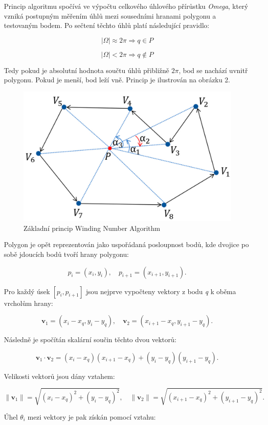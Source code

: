 \documentclass[a4paper,12pt]{article}
\begin{document}
Princip algoritmu spočívá ve výpočtu celkového úhlového přírůstku \textit{Omega}, který vzniká postupným měřením úhlů mezi sousedními hranami polygonu a testovaným bodem. Po sečtení těchto úhlů platí následující pravidlo:

\[
\left| \Omega \right| \approx 2\pi \Rightarrow q \in P
\]

\[
\left| \Omega \right| < 2\pi \Rightarrow q \notin P
\]

Tedy pokud je absolutní hodnota součtu úhlů přibližně \( 2\pi \), bod se nachází uvnitř polygonu. Pokud je menší, bod leží vně. Princip je ilustrován na obrázku 2.

\begin{figure}[H]
    \centering
    \includegraphics[width=0.6\linewidth]{winding.png}
    \caption{Základní princip Winding Number Algorithm \parencite{obr2}}
    \label{fig:winding_number}
\end{figure}


Polygon je opět reprezentován jako uspořádaná posloupnost bodů, kde dvojice po sobě jdoucích bodů tvoří hrany polygonu:

\[
p_i = (x_i, y_i), \quad p_{i+1} = (x_{i+1}, y_{i+1}).
\]

Pro každý úsek \([p_i, p_{i+1}]\) jsou nejprve vypočteny vektory z bodu \textit{q} k oběma vrcholům hrany:

\[
\mathbf{v}_1 = (x_i - x_q, y_i - y_q), \quad \mathbf{v}_2 = (x_{i+1} - x_q, y_{i+1} - y_q).
\]

Následně je spočítán skalární součin těchto dvou vektorů:

\[
\mathbf{v}_1 \cdot \mathbf{v}_2 = (x_i - x_q)(x_{i+1} - x_q) + (y_i - y_q)(y_{i+1} - y_q).
\]

Velikosti vektorů jsou dány vztahem:

\[
\|\mathbf{v}_1\| = \sqrt{(x_i - x_q)^2 + (y_i - y_q)^2}, \quad \|\mathbf{v}_2\| = \sqrt{(x_{i+1} - x_q)^2 + (y_{i+1} - y_q)^2}.
\]

Úhel \( \theta_i \) mezi vektory je pak získán pomocí vztahu:
\end{document}
